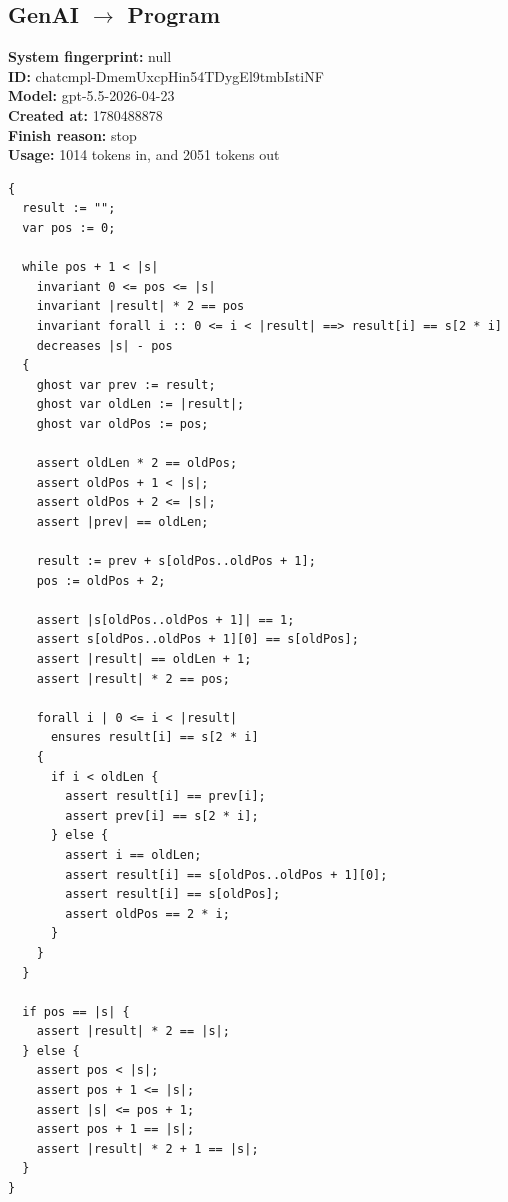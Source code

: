 \documentclass{article}
\begin{document}
\subsection*{GenAI $\rightarrow$ Program}
\textbf{System fingerprint: }null
\\\textbf{ID: }chatcmpl-DmemUxcpHin54TDygEl9tmbIstiNF
\\\textbf{Model: }gpt-5.5-2026-04-23
\\\textbf{Created at: }1780488878
\\\textbf{Finish reason: }stop
\\\textbf{Usage: }1014 tokens in, and 2051 tokens out
\begin{lstlisting}
{
  result := "";
  var pos := 0;

  while pos + 1 < |s|
    invariant 0 <= pos <= |s|
    invariant |result| * 2 == pos
    invariant forall i :: 0 <= i < |result| ==> result[i] == s[2 * i]
    decreases |s| - pos
  {
    ghost var prev := result;
    ghost var oldLen := |result|;
    ghost var oldPos := pos;

    assert oldLen * 2 == oldPos;
    assert oldPos + 1 < |s|;
    assert oldPos + 2 <= |s|;
    assert |prev| == oldLen;

    result := prev + s[oldPos..oldPos + 1];
    pos := oldPos + 2;

    assert |s[oldPos..oldPos + 1]| == 1;
    assert s[oldPos..oldPos + 1][0] == s[oldPos];
    assert |result| == oldLen + 1;
    assert |result| * 2 == pos;

    forall i | 0 <= i < |result|
      ensures result[i] == s[2 * i]
    {
      if i < oldLen {
        assert result[i] == prev[i];
        assert prev[i] == s[2 * i];
      } else {
        assert i == oldLen;
        assert result[i] == s[oldPos..oldPos + 1][0];
        assert result[i] == s[oldPos];
        assert oldPos == 2 * i;
      }
    }
  }

  if pos == |s| {
    assert |result| * 2 == |s|;
  } else {
    assert pos < |s|;
    assert pos + 1 <= |s|;
    assert |s| <= pos + 1;
    assert pos + 1 == |s|;
    assert |result| * 2 + 1 == |s|;
  }
}
\end{lstlisting}
\end{document}
